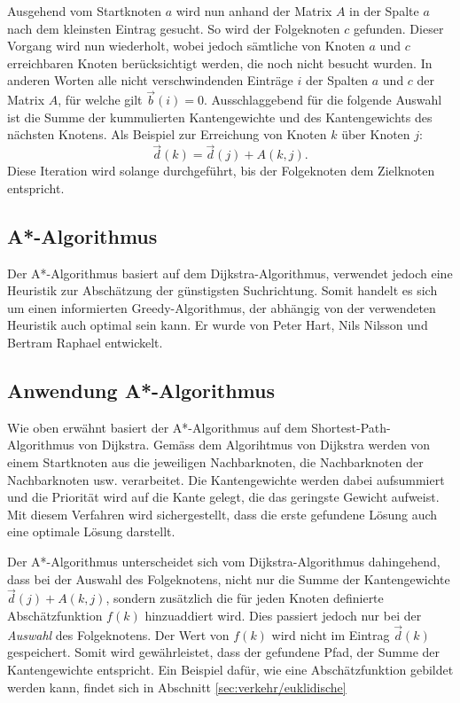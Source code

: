 Ausgehend vom Startknoten $a$ wird nun anhand der Matrix $A$ in der Spalte $a$ nach dem kleinsten Eintrag gesucht. So wird der Folgeknoten $c$ gefunden. Dieser Vorgang wird nun wiederholt, wobei jedoch sämtliche von Knoten $a$ und $c$ erreichbaren Knoten berücksichtigt werden, die noch nicht besucht wurden. In anderen Worten alle nicht verschwindenden Einträge $i$ der Spalten $a$ und $c$ der Matrix $A$, für welche gilt $\vec{b}(i)=0$. Ausschlaggebend für die folgende Auswahl ist die Summe der kummulierten Kantengewichte und des Kantengewichts des nächsten Knotens. Als Beispiel zur Erreichung von Knoten $k$ über Knoten $j$:
\begin{equation}
\vec{d}(k)=\vec{d}(j)+A(k,j).
\end{equation}
Diese Iteration wird solange durchgeführt, bis der Folgeknoten dem Zielknoten entspricht.

\subsection{A*-Algorithmus}
Der A*-Algorithmus basiert auf dem Dijkstra-Algorithmus, verwendet jedoch eine Heuristik zur Abschätzung der günstigsten Suchrichtung. Somit handelt es sich um einen informierten Greedy-Algorithmus, der abhängig von der verwendeten Heuristik auch optimal sein kann. Er wurde von Peter Hart, Nils Nilsson und Bertram Raphael entwickelt.
%
%
%
%

\subsection{Anwendung A*-Algorithmus}
Wie oben erwähnt basiert der A*-Algorithmus auf dem Shortest-Path-Algorithmus von Dijkstra. Gemäss dem Algorihtmus von Dijkstra werden von einem Startknoten aus die jeweiligen Nachbarknoten, die Nachbarknoten der Nachbarknoten usw. verarbeitet. Die Kantengewichte werden dabei aufsummiert und die Priorität wird auf die Kante gelegt, die das geringste Gewicht aufweist. Mit diesem Verfahren wird sichergestellt, dass die erste gefundene Lösung auch eine optimale Lösung darstellt.\\
%

Der A*-Algorithmus unterscheidet sich vom Dijkstra-Algorithmus dahingehend, dass bei der Auswahl des Folgeknotens, nicht nur die Summe der Kantengewichte $\vec{d}(j)+A(k,j)$, sondern zusätzlich die für jeden Knoten definierte Abschätzfunktion $f(k)$ hinzuaddiert wird. Dies passiert jedoch nur bei der \emph{Auswahl} des Folgeknotens. Der Wert von $f(k)$ wird nicht im Eintrag $\vec{d}(k)$ gespeichert. Somit wird gewährleistet, dass der gefundene Pfad, der Summe der Kantengewichte entspricht. Ein Beispiel dafür, wie eine Abschätzfunktion gebildet werden kann, findet sich in Abschnitt \ref{sec:verkehr/euklidische}

